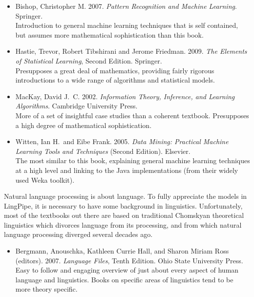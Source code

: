 \begin{itemize}
\item
Bishop, Christopher M.
2007.
{\it Pattern Recognition and Machine Learning}.
Springer.
\\
{\footnotesize Introduction to general machine learning
techniques that is self contained, but assumes more mathematical
sophistication than this book.}
%
\item
Hastie, Trevor, Robert Tibshirani and Jerome Friedman.
2009.
{\it The Elements of Statistical Learning}, Second Edition.
Springer.
\\
{\footnotesize Presupposes a great deal of mathematics, providing
fairly rigorous introductions to a wide range of algorithms and
statistical models.}
%
\item
MacKay, David J.~C.
2002.
{\it Information Theory, Inference, and Learning Algorithms}.
Cambridge University Press.
\\
{\footnotesize More of a set of insightful case studies than a coherent textbook.
Presupposes a high degree of mathematical sophistication.}
%
\item 
Witten, Ian H.\ and Eibe Frank. 2005. {\it Data Mining: Practical
Machine Learning Tools and Techniques} (Second Edition).  Elsevier.
\\
{\footnotesize The most similar to this book, explaining general machine
learning techniques at a high level and 
linking to the Java implementations (from their widely used Weka toolkit).}
%
\end{itemize}





\noindent
Natural language processing is about language.  To fully appreciate
the models in LingPipe, it is necessary to have some background in
linguistics.  Unfortunately, most of the textbooks out there are based
on traditional Chomskyan theoretical linguistics which divorces
language from its processing, and from which natural language
processing diverged several decades ago.

\begin{itemize}
%
\item Bergmann, Anouschka, Kathleen Currie Hall, and Sharon Miriam Ross (editors).
2007.
{\it Language Files}, Tenth Edition.
Ohio State University Press.
\\
{\footnotesize Easy to follow and engaging overview of just about every
aspect of human language and linguistics.  Books on specific areas of
linguistics tend to be more theory specific.}
%
\end{itemize}


